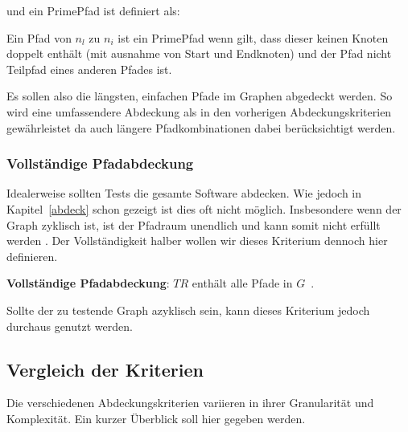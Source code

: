 und ein PrimePfad ist definiert als:

\begin{definition}
    Ein Pfad von $n_{l}$ zu $n_{i}$ ist ein PrimePfad wenn gilt, dass dieser keinen Knoten doppelt enthält (mit ausnahme von Start und Endknoten) und
    der Pfad nicht Teilpfad eines anderen Pfades ist.
    \label{primepfad}
\end{definition}

Es sollen also die längsten, einfachen Pfade im Graphen abgedeckt werden.
So wird eine umfassendere Abdeckung als in den vorherigen Abdeckungskriterien gewährleistet da auch längere Pfadkombinationen dabei berücksichtigt werden.

\subsubsection{Vollständige Pfadabdeckung}

Idealerweise sollten Tests die gesamte Software abdecken.
Wie jedoch in Kapitel~\ref{abdeck} schon gezeigt ist dies oft nicht möglich.
Insbesondere wenn der Graph zyklisch ist, ist der Pfadraum unendlich und kann somit nicht erfüllt werden \cite[vgl. S. 36 ]{software-testing}.
Der Vollständigkeit halber wollen wir dieses Kriterium dennoch hier definieren.

\begin{definition}
    \textbf{Vollständige Pfadabdeckung}: $TR$ enthält alle Pfade in $G$~\cite[vgl. Criterion 2.7]{software-testing}.
    \label{completecov}
\end{definition}

Sollte der zu testende Graph azyklisch sein, kann dieses Kriterium jedoch durchaus genutzt werden.

\subsection{Vergleich der Kriterien}

Die verschiedenen Abdeckungskriterien variieren in ihrer Granularität und Komplexität.
Ein kurzer Überblick soll hier gegeben werden.

